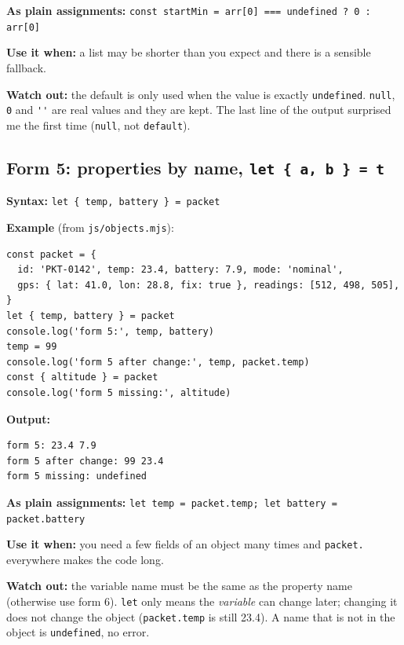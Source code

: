 \textbf{As plain assignments:} \passthrough{\lstinline!const startMin = arr[0] === undefined ? 0 : arr[0]!}

\textbf{Use it when:} a list may be shorter than you expect and there is a sensible fallback.

\textbf{Watch out:} the default is only used when the value is exactly \passthrough{\lstinline!undefined!}. \passthrough{\lstinline!null!}, \passthrough{\lstinline!0!} and \passthrough{\lstinline!''!} are real values and they are kept. The last line of the output surprised me the first time (\passthrough{\lstinline!null!}, not \passthrough{\lstinline!default!}).

\hypertarget{form-5-properties-by-name-let--a-b---t}{%
\subsection{\texorpdfstring{Form 5: properties by name, \texttt{let\ \{\ a,\ b\ \}\ =\ t}}{Form 5: properties by name, let \{ a, b \} = t}}\label{form-5-properties-by-name-let--a-b---t}}

\textbf{Syntax:} \passthrough{\lstinline!let \{ temp, battery \} = packet!}

\textbf{Example} (from \passthrough{\lstinline!js/objects.mjs!}):

\begin{lstlisting}
const packet = {
  id: 'PKT-0142', temp: 23.4, battery: 7.9, mode: 'nominal',
  gps: { lat: 41.0, lon: 28.8, fix: true }, readings: [512, 498, 505],
}
let { temp, battery } = packet
console.log('form 5:', temp, battery)
temp = 99
console.log('form 5 after change:', temp, packet.temp)
const { altitude } = packet
console.log('form 5 missing:', altitude)
\end{lstlisting}

\textbf{Output:}

\begin{lstlisting}
form 5: 23.4 7.9
form 5 after change: 99 23.4
form 5 missing: undefined
\end{lstlisting}

\textbf{As plain assignments:} \passthrough{\lstinline!let temp = packet.temp; let battery = packet.battery!}

\textbf{Use it when:} you need a few fields of an object many times and \passthrough{\lstinline!packet.!} everywhere makes the code long.

\textbf{Watch out:} the variable name must be the same as the property name (otherwise use form 6). \passthrough{\lstinline!let!} only means the \emph{variable} can change later; changing it does not change the object (\passthrough{\lstinline!packet.temp!} is still 23.4). A name that is not in the object is \passthrough{\lstinline!undefined!}, no error.

